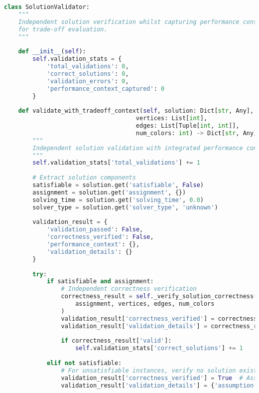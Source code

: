 \begin{lstlisting}[language=Python, caption=Independent Solution Validation with Trade-off Context]
class SolutionValidator:
    """
    Independent solution verification whilst capturing performance context
    for trade-off evaluation.
    """
    
    def __init__(self):
        self.validation_stats = {
            'total_validations': 0,
            'correct_solutions': 0,
            'validation_errors': 0,
            'performance_context_captured': 0
        }
    
    def validate_with_tradeoff_context(self, solution: Dict[str, Any], 
                                     vertices: List[int], 
                                     edges: List[Tuple[int, int]],
                                     num_colors: int) -> Dict[str, Any]:
        """
        Independent solution validation with integrated performance context assessment.
        """
        self.validation_stats['total_validations'] += 1
        
        # Extract solution components
        satisfiable = solution.get('satisfiable', False)
        assignment = solution.get('assignment', {})
        solving_time = solution.get('solving_time', 0.0)
        solver_type = solution.get('solver_type', 'unknown')
        
        validation_result = {
            'validation_passed': False,
            'correctness_verified': False,
            'performance_context': {},
            'validation_details': {}
        }
        
        try:
            if satisfiable and assignment:
                # Independent correctness verification
                correctness_result = self._verify_solution_correctness(
                    assignment, vertices, edges, num_colors
                )
                validation_result['correctness_verified'] = correctness_result['valid']
                validation_result['validation_details'] = correctness_result['details']
                
                if correctness_result['valid']:
                    self.validation_stats['correct_solutions'] += 1
            
            elif not satisfiable:
                # For unsatisfiable instances, verify no solution exists (simplified check)
                validation_result['correctness_verified'] = True  # Assume correct for UNSAT
                validation_result['validation_details'] = {'assumption': 'UNSAT_assumed_correct'}
            

\end{lstlisting}

